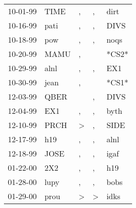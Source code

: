 \begin{supertabular}{p{0.07\textwidth}p{0.06\textwidth}p{0.02\textwidth}p{0.02\textwidth}p{0.06\textwidth}}
          10-01-99\textsuperscript{} &           TIME\textsuperscript{} &                , &                , &           dirt\textsuperscript{} \\
          10-16-99\textsuperscript{} &           pati\textsuperscript{} &                , &                , &           DIVS\textsuperscript{} \\
          10-18-99\textsuperscript{} &            pow\textsuperscript{} &                , &                , &           noqs\textsuperscript{} \\
          10-20-99\textsuperscript{} &           MAMU\textsuperscript{} &                , &                  &                            *CS2* \\
          10-29-99\textsuperscript{} &           alnl\textsuperscript{} &                , &                , &            EX1\textsuperscript{} \\
          10-30-99\textsuperscript{} &           jean\textsuperscript{} &                , &                  &                            *CS1* \\
          12-03-99\textsuperscript{} &           QBER\textsuperscript{} &                  &                , &           DIVS\textsuperscript{} \\
          12-04-99\textsuperscript{} &            EX1\textsuperscript{} &                , &                , &           byth\textsuperscript{} \\
          12-10-99\textsuperscript{} &           PRCH\textsuperscript{} &     \textgreater &                , &           SIDE\textsuperscript{} \\
          12-17-99\textsuperscript{} &            h19\textsuperscript{} &                , &                , &           alnl\textsuperscript{} \\
          12-18-99\textsuperscript{} &           JOSE\textsuperscript{} &                , &                , &           igaf\textsuperscript{} \\
          01-22-00\textsuperscript{} &            2X2\textsuperscript{} &                , &                , &            h19\textsuperscript{} \\
          01-28-00\textsuperscript{} &           lupy\textsuperscript{} &                , &                , &           bobs\textsuperscript{} \\
          01-29-00\textsuperscript{} &           prou\textsuperscript{} &     \textgreater &     \textgreater &           idks\textsuperscript{} \\

\end{supertabular}

